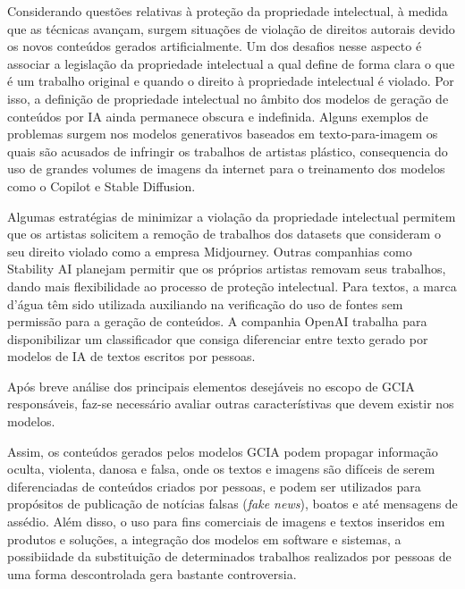 
Considerando questões relativas à proteção da propriedade intelectual, 
à medida que as técnicas avançam, surgem situações de violação de direitos autorais
devido os novos conteúdos gerados artificialmente. Um dos desafios nesse aspecto 
é associar a legislação da propriedade intelectual a qual define de forma clara o que é um trabalho original 
e quando o direito à propriedade intelectual é violado. Por isso, a definição de propriedade intelectual no âmbito 
dos modelos de geração de conteúdos por IA ainda permanece obscura e indefinida.
Alguns exemplos de problemas surgem nos modelos generativos 
baseados em texto-para-imagem os quais são acusados de infringir os trabalhos de artistas plástico, 
consequencia do uso de grandes volumes de imagens da internet para o treinamento dos modelos como o Copilot e Stable Diffusion.

Algumas estratégias de minimizar a violação da propriedade intelectual permitem que os artistas solicitem a remoção 
de trabalhos dos datasets que consideram o seu direito violado como a empresa Midjourney. 
Outras companhias como Stability AI planejam permitir que os próprios artistas removam seus trabalhos, 
dando mais flexibilidade ao processo de proteção intelectual. 
Para textos, a marca d'água têm sido utilizada auxiliando na verificação do uso de fontes sem permissão para a geração 
de conteúdos. A companhia OpenAI trabalha para disponibilizar um classificador que consiga diferenciar entre 
texto gerado por modelos de IA de textos escritos por pessoas.


Após breve análise dos principais elementos desejáveis no escopo de GCIA responsáveis, faz-se necessário avaliar  
outras característivas que devem existir nos modelos.

Assim, os conteúdos gerados pelos modelos GCIA podem propagar informação oculta, violenta, danosa e falsa, onde os textos e 
imagens são difíceis de serem diferenciadas de conteúdos criados por pessoas, e podem ser utilizados para propósitos 
de publicação de notícias falsas (\textit{fake news}), boatos e até mensagens de assédio. 
Além disso, o uso para fins comerciais de imagens e textos inseridos 
em produtos e soluções, a integração dos modelos em software e sistemas, a possibiidade da substituição 
de determinados trabalhos realizados por pessoas de uma forma descontrolada gera bastante controversia.

